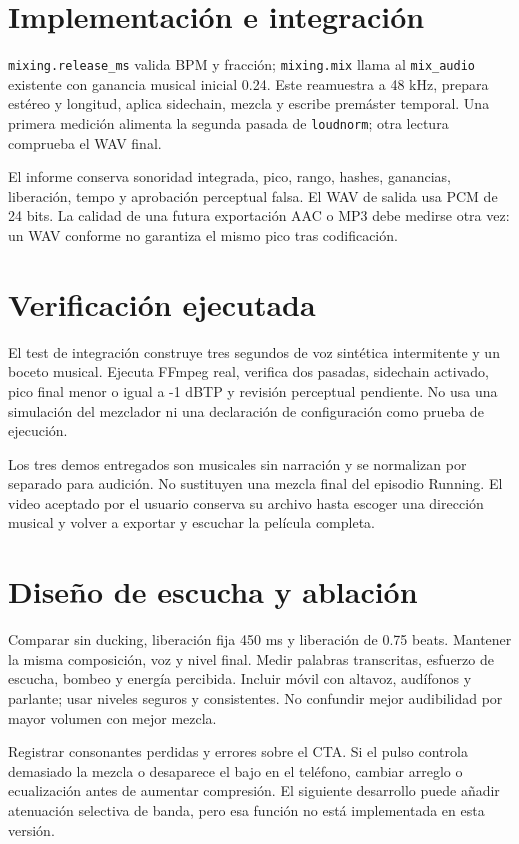 \documentclass[11pt,a4paper]{article}
\begin{document}
\newpage
\section{Implementación e integración}
\texttt{mixing.release\_ms} valida BPM y fracción; \texttt{mixing.mix} llama al \texttt{mix\_audio} existente con ganancia musical inicial 0.24. Este reamuestra a 48 kHz, prepara estéreo y longitud, aplica sidechain, mezcla y escribe premáster temporal. Una primera medición alimenta la segunda pasada de \texttt{loudnorm}; otra lectura comprueba el WAV final.

El informe conserva sonoridad integrada, pico, rango, hashes, ganancias, liberación, tempo y aprobación perceptual falsa. El WAV de salida usa PCM de 24 bits. La calidad de una futura exportación AAC o MP3 debe medirse otra vez: un WAV conforme no garantiza el mismo pico tras codificación.
\section{Verificación ejecutada}
El test de integración construye tres segundos de voz sintética intermitente y un boceto musical. Ejecuta FFmpeg real, verifica dos pasadas, sidechain activado, pico final menor o igual a -1 dBTP y revisión perceptual pendiente. No usa una simulación del mezclador ni una declaración de configuración como prueba de ejecución.

Los tres demos entregados son musicales sin narración y se normalizan por separado para audición. No sustituyen una mezcla final del episodio Running. El video aceptado por el usuario conserva su archivo hasta escoger una dirección musical y volver a exportar y escuchar la película completa.
\section{Diseño de escucha y ablación}
Comparar sin ducking, liberación fija 450 ms y liberación de 0.75 beats. Mantener la misma composición, voz y nivel final. Medir palabras transcritas, esfuerzo de escucha, bombeo y energía percibida. Incluir móvil con altavoz, audífonos y parlante; usar niveles seguros y consistentes. No confundir mejor audibilidad por mayor volumen con mejor mezcla.

Registrar consonantes perdidas y errores sobre el CTA. Si el pulso controla demasiado la mezcla o desaparece el bajo en el teléfono, cambiar arreglo o ecualización antes de aumentar compresión. El siguiente desarrollo puede añadir atenuación selectiva de banda, pero esa función no está implementada en esta versión.
\end{document}
